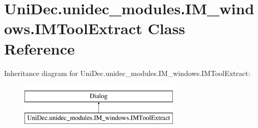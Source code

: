 \hypertarget{class_uni_dec_1_1unidec__modules_1_1_i_m__windows_1_1_i_m_tool_extract}{}\section{Uni\+Dec.\+unidec\+\_\+modules.\+I\+M\+\_\+windows.\+I\+M\+Tool\+Extract Class Reference}
\label{class_uni_dec_1_1unidec__modules_1_1_i_m__windows_1_1_i_m_tool_extract}
Inheritance diagram for Uni\+Dec.\+unidec\+\_\+modules.\+I\+M\+\_\+windows.\+I\+M\+Tool\+Extract\+:\begin{figure}[H]
\begin{center}
\leavevmode
\includegraphics[height=2.000000cm]{class_uni_dec_1_1unidec__modules_1_1_i_m__windows_1_1_i_m_tool_extract}
\end{center}
\end{figure}
